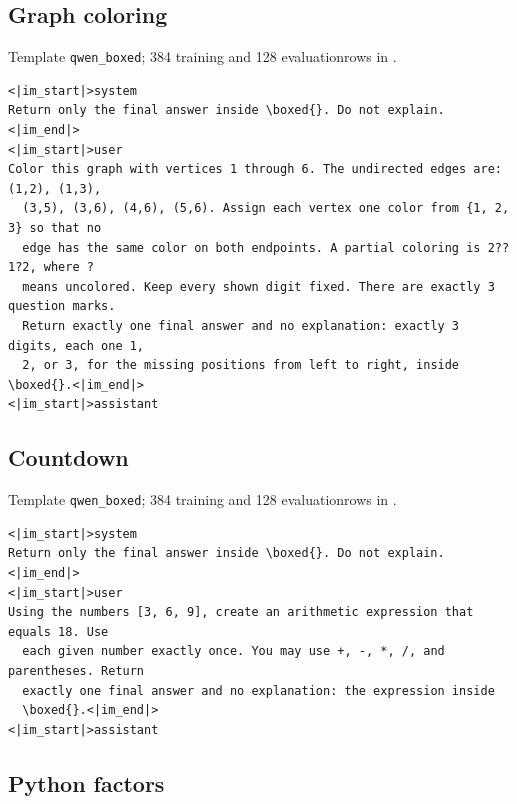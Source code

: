 \documentclass{article}
\newcommand{\1}{\mathbf 1}
\theoremstyle{remark}
\theoremstyle{definition}
\theoremstyle{plain}
\begin{document}

\filbreak
\subsection{Graph coloring}
\label{app:prompt-graph}

\noindent Template \texttt{qwen\_boxed}; 384 training and 128 evaluation\newline rows in .

\begin{Verbatim}[fontsize=\scriptsize,frame=single,framesep=4pt,rulecolor=\color{black!25},samepage=true]
<|im_start|>system
Return only the final answer inside \boxed{}. Do not explain.<|im_end|>
<|im_start|>user
Color this graph with vertices 1 through 6. The undirected edges are: (1,2), (1,3),
  (3,5), (3,6), (4,6), (5,6). Assign each vertex one color from {1, 2, 3} so that no
  edge has the same color on both endpoints. A partial coloring is 2??1?2, where ?
  means uncolored. Keep every shown digit fixed. There are exactly 3 question marks.
  Return exactly one final answer and no explanation: exactly 3 digits, each one 1,
  2, or 3, for the missing positions from left to right, inside \boxed{}.<|im_end|>
<|im_start|>assistant
\end{Verbatim}

\filbreak
\subsection{Countdown}
\label{app:prompt-countdown}

\noindent Template \texttt{qwen\_boxed}; 384 training and 128 evaluation\newline rows in .

\begin{Verbatim}[fontsize=\scriptsize,frame=single,framesep=4pt,rulecolor=\color{black!25},samepage=true]
<|im_start|>system
Return only the final answer inside \boxed{}. Do not explain.<|im_end|>
<|im_start|>user
Using the numbers [3, 6, 9], create an arithmetic expression that equals 18. Use
  each given number exactly once. You may use +, -, *, /, and parentheses. Return
  exactly one final answer and no explanation: the expression inside
  \boxed{}.<|im_end|>
<|im_start|>assistant
\end{Verbatim}

\filbreak
\subsection{Python factors}
\label{app:prompt-python}
\end{document}
